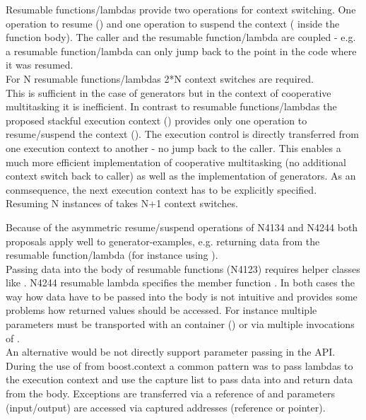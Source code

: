 Resumable functions/lambdas provide two operations for context switching. One
operation to resume (\rlop) and one operation to suspend the context (\yield
inside the function body). The caller and the resumable function/lambda are
coupled - e.g. a resumable function/lambda can only jump back to the point in
the code where it was resumed.\\
\newline
For N resumable functions/lambdas 2*N context switches are required.\\
This is sufficient in the case of generators but in the context of cooperative
multitasking it is inefficient.
In contrast to resumable functions/lambdas the proposed stackful execution
context (\ectx) provides only one operation to resume/suspend the context
(\ectxop). The execution control is directly transferred from one
execution context to another - no jump back to the caller. This enables a much
more efficient implementation of cooperative multitasking (no additional context
switch back to caller) as well as the implementation of generators. As an
conmsequence, the next execution context has to be explicitly specified.\\
\newline
Resuming N instances of \ectx takes N+1 context switches.

Because of the asymmetric resume/suspend operations of N4134 and N4244 both
proposals apply well to generator-examples, e.g. returning data from the
resumable function/lambda (for instance using \yield).\\
Passing data into the body of resumable functions (N4123) requires helper
classes like \channel.
N4244 resumable lambda specifies the member function \rlwanted.
In both cases the way how data have to be passed into the body is not intuitive
and provides some problems how returned values should be accessed. For instance
multiple parameters must be transported with an container (\tuple) or via
multiple invocations of \rlwanted.\\
\newline
An alternative would be not directly support parameter passing in the API.\\
During the use of  from boost.context\cite{bcontext} a
common pattern was to pass lambdas to the execution context and use the capture
list to pass data into and return data from the body. Exceptions are transferred
via a reference of \excpt and parameters (input/output) are accessed via
captured addresses (reference or pointer).

